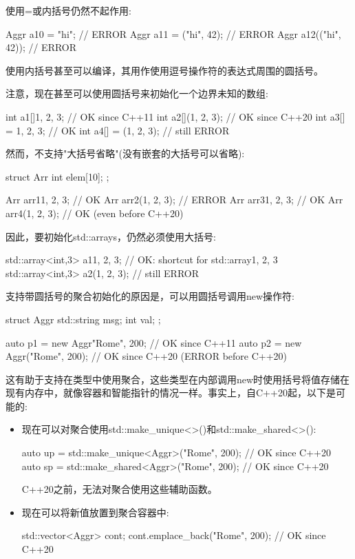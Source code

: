 使用=或内括号仍然不起作用:

\begin{cpp}
Aggr a10 = "hi"; // ERROR
Aggr a11 = ("hi", 42); // ERROR
Aggr a12(("hi", 42)); // ERROR
\end{cpp}

使用内括号甚至可以编译，其用作使用逗号操作符的表达式周围的圆括号。

注意，现在甚至可以使用圆括号来初始化一个边界未知的数组:

\begin{cpp}
int a1[]{1, 2, 3}; // OK since C++11
int a2[](1, 2, 3); // OK since C++20
int a3[] = {1, 2, 3}; // OK
int a4[] = (1, 2, 3); // still ERROR
\end{cpp}

然而，不支持"大括号省略"(没有嵌套的大括号可以省略):

\begin{cpp}
struct Arr {
	int elem[10];
};

Arr arr1{1, 2, 3}; // OK
Arr arr2(1, 2, 3); // ERROR
Arr arr3{{1, 2, 3}}; // OK
Arr arr4({1, 2, 3}); // OK (even before C++20)
\end{cpp}

因此，要初始化std::arrays，仍然必须使用大括号:

\begin{cpp}
std::array<int,3> a1{1, 2, 3}; // OK: shortcut for std::array{{1, 2, 3}}
std::array<int,3> a2(1, 2, 3); // still ERROR
\end{cpp}


支持带圆括号的聚合初始化的原因是，可以用圆括号调用new操作符:

\begin{cpp}
struct Aggr {
	std::string msg;
	int val;
};

auto p1 = new Aggr{"Rome", 200}; // OK since C++11
auto p2 = new Aggr("Rome", 200); // OK since C++20 (ERROR before C++20)
\end{cpp}

这有助于支持在类型中使用聚合，这些类型在内部调用new时使用括号将值存储在现有内存中，就像容器和智能指针的情况一样。事实上，自C++20起，以下是可能的:

\begin{itemize}
\item 
现在可以对聚合使用std::make\_unique<>()和std::make\_shared<>():

\begin{cpp}
auto up = std::make_unique<Aggr>("Rome", 200); // OK since C++20
auto sp = std::make_shared<Aggr>("Rome", 200); // OK since C++20
\end{cpp}

C++20之前，无法对聚合使用这些辅助函数。

\item 
现在可以将新值放置到聚合容器中:

\begin{cpp}
std::vector<Aggr> cont;
cont.emplace_back("Rome", 200); // OK since C++20
\end{cpp}
\end{itemize}

